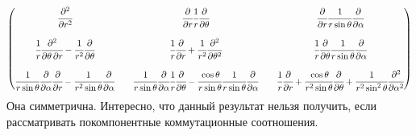 \[
	\begin{pmatrix}
		\cfrac{\partial^2}{\partial r^2} && 
		\cfrac{\partial}{\partial r} \cfrac{1}{r}\cfrac{\partial}{\partial \theta} &&
		\cfrac{\partial}{\partial r} \cfrac{1}{r \sin \theta}\cfrac{\partial}{\partial \alpha} \\\\
		\cfrac{1}{r} \cfrac{\partial^2}{\partial \theta\, \partial r} - \cfrac{1}{r^2} \cfrac{\partial}{\partial \theta} &&
		\cfrac{1}{r} \cfrac{\partial}{\partial r} + \cfrac{1}{r^2} \cfrac{\partial^2}{\partial \theta^2} &&
		\cfrac{1}{r}\cfrac{\partial}{\partial \theta} \cfrac{1}{r \sin \theta}\cfrac{\partial}{\partial \alpha} \\\\
		\cfrac{1}{r \sin \theta} \cfrac{\partial}{\partial \alpha} \cfrac{\partial}{\partial r} - \cfrac{1}{r^2 \sin \theta} \cfrac{\partial}{\partial \alpha} &&
		\cfrac{1}{r \sin \theta}\cfrac{\partial}{\partial \alpha}\cfrac{1}{r}\cfrac{\partial}{\partial \theta} - \cfrac{\cos \theta}{r \sin \theta} \cfrac{1}{r \sin \theta}\cfrac{\partial}{\partial \alpha} &&
		\cfrac{1}{r} \cfrac{\partial}{\partial r} + \cfrac{\cos \theta}{r^2 \sin \theta}\cfrac{\partial}{\partial \theta} + \cfrac{1}{r^2 \sin^2 \theta} \cfrac{\partial^2}{\partial \alpha^2}
	\end{pmatrix}
\]
Она симметрична. Интересно, что данный результат нельзя получить, если рассматривать покомпонентные коммутационные соотношения.